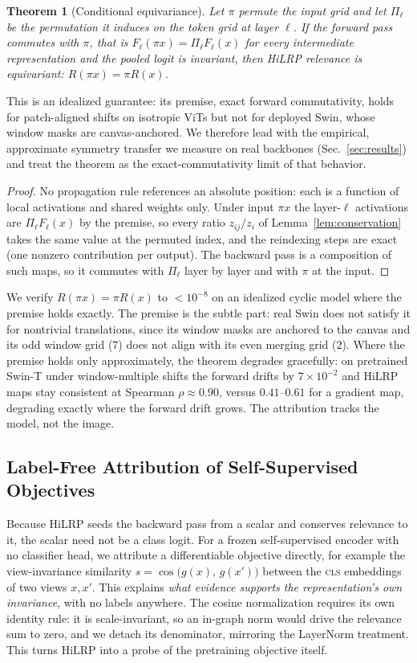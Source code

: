 \documentclass[lettersize,journal]{IEEEtran}
\newtheorem{theorem}{Theorem}
\begin{document}
\begin{theorem}[Conditional equivariance]
\label{thm:equivariance}
Let $\pi$ permute the input grid and let $\Pi_\ell$ be the permutation it induces on the token grid at layer $\ell$. If the forward pass commutes with $\pi$, that is $F_\ell(\pi x)=\Pi_\ell F_\ell(x)$ for every intermediate representation and the pooled logit is invariant, then HiLRP relevance is equivariant: $R(\pi x)=\pi R(x)$.
\end{theorem}
\noindent This is an idealized guarantee: its premise, exact forward commutativity, holds for patch-aligned shifts on isotropic ViTs but not for deployed Swin, whose window masks are canvas-anchored. We therefore lead with the empirical, approximate symmetry transfer we measure on real backbones (Sec.~\ref{sec:results}) and treat the theorem as the exact-commutativity limit of that behavior.
\begin{proof}
No propagation rule references an absolute position: each is a function of local activations and shared weights only. Under input $\pi x$ the layer-$\ell$ activations are $\Pi_\ell F_\ell(x)$ by the premise, so every ratio $z_{ij}/z_i$ of Lemma~\ref{lem:conservation} takes the same value at the permuted index, and the reindexing steps are exact (one nonzero contribution per output). The backward pass is a composition of such maps, so it commutes with $\Pi_\ell$ layer by layer and with $\pi$ at the input.
\end{proof}
We verify $R(\pi x)=\pi R(x)$ to $<10^{-8}$ on an idealized cyclic model where the premise holds exactly. The premise is the subtle part: real Swin does not satisfy it for nontrivial translations, since its window masks are anchored to the canvas and its odd window grid ($7$) does not align with its even merging grid ($2$). Where the premise holds only approximately, the theorem degrades gracefully: on pretrained Swin-T under window-multiple shifts the forward drifts by $7\times10^{-2}$ and HiLRP maps stay consistent at Spearman $\rho{\approx}0.90$, versus $0.41$--$0.61$ for a gradient map, degrading exactly where the forward drift grows. The attribution tracks the model, not the image.

\subsection{Label-Free Attribution of Self-Supervised Objectives}
\label{sec:ssl}
Because HiLRP seeds the backward pass from a scalar and conserves relevance to it, the scalar need not be a class logit. For a frozen self-supervised encoder with no classifier head, we attribute a differentiable objective directly, for example the view-invariance similarity $s=\cos\!\big(g(x),\,g(x')\big)$ between the \textsc{cls} embeddings of two views $x,x'$. This explains \emph{what evidence supports the representation's own invariance}, with no labels anywhere. The cosine normalization requires its own identity rule: it is scale-invariant, so an in-graph norm would drive the relevance sum to zero, and we detach its denominator, mirroring the LayerNorm treatment. This turns HiLRP into a probe of the pretraining objective itself.
\end{document}
